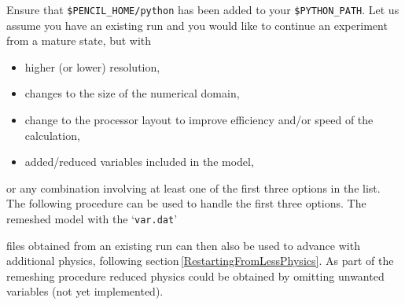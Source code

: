 \documentclass[\mydriver,12pt,twoside,notitlepage,a4paper]{article}
\makeatletter
\newcommand{\file}[2][]{%
  \def\index@{#1}%
  `\texttt{#2}'%
  \ifx\index@\@empty\index[file]{#2@\texttt{#2}}%
  \else\index[file]{#1@\texttt{#1}}%
  \fi%
}
\makeatother
\begin{document}
Ensure that \texttt{\$PENCIL\_HOME/python} has been added to your
\texttt{\$PYTHON\_PATH}.
Let us assume you have an existing run and you would like to continue an 
experiment from a mature state, but with 
\begin{itemize}
\item
  higher (or lower) resolution,
\item
  changes to the size of the numerical domain,
\item
  change to the processor layout to improve efficiency and/or speed of the
  calculation,
\item
  added/reduced variables included in the model,
\end{itemize}
or any combination involving at least one of the first three options in the
list.
The following procedure can be used to handle the first three options.
The remeshed model with the \file{var.dat}
files obtained from an existing run can 
then also be used to advance with additional physics, following
section\,\ref{RestartingFromLessPhysics}.
As part of the remeshing procedure reduced physics could be obtained by
omitting unwanted variables (not yet implemented).
\end{document}
